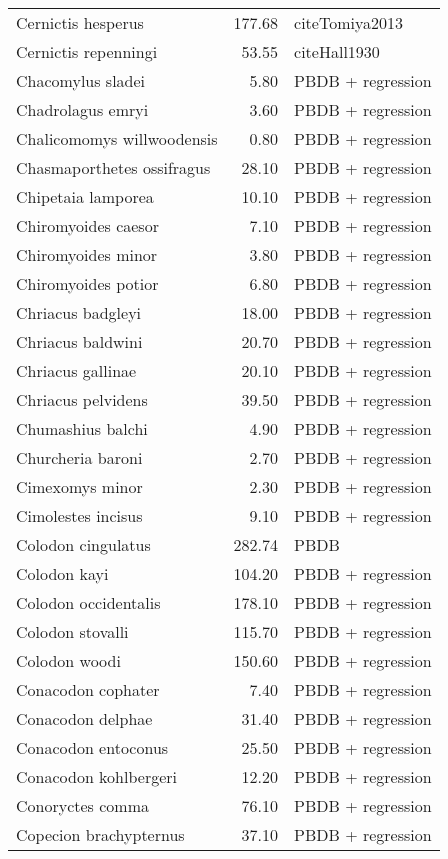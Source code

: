 \begin{table}[ht]
\begin{tabular}{lrl}
  Cernictis hesperus & 177.68 & cite{Tomiya2013} \\ 
  Cernictis repenningi & 53.55 & cite{Hall1930} \\ 
  Chacomylus sladei & 5.80 & PBDB + regression \\ 
  Chadrolagus emryi & 3.60 & PBDB + regression \\ 
  Chalicomomys willwoodensis & 0.80 & PBDB + regression \\ 
  Chasmaporthetes ossifragus & 28.10 & PBDB + regression \\ 
  Chipetaia lamporea & 10.10 & PBDB + regression \\ 
  Chiromyoides caesor & 7.10 & PBDB + regression \\ 
  Chiromyoides minor & 3.80 & PBDB + regression \\ 
  Chiromyoides potior & 6.80 & PBDB + regression \\ 
  Chriacus badgleyi & 18.00 & PBDB + regression \\ 
  Chriacus baldwini & 20.70 & PBDB + regression \\ 
  Chriacus gallinae & 20.10 & PBDB + regression \\ 
  Chriacus pelvidens & 39.50 & PBDB + regression \\ 
  Chumashius balchi & 4.90 & PBDB + regression \\ 
  Churcheria baroni & 2.70 & PBDB + regression \\ 
  Cimexomys minor & 2.30 & PBDB + regression \\ 
  Cimolestes incisus & 9.10 & PBDB + regression \\ 
  Colodon cingulatus & 282.74 & PBDB \\ 
  Colodon kayi & 104.20 & PBDB + regression \\ 
  Colodon occidentalis & 178.10 & PBDB + regression \\ 
  Colodon stovalli & 115.70 & PBDB + regression \\ 
  Colodon woodi & 150.60 & PBDB + regression \\ 
  Conacodon cophater & 7.40 & PBDB + regression \\ 
  Conacodon delphae & 31.40 & PBDB + regression \\ 
  Conacodon entoconus & 25.50 & PBDB + regression \\ 
  Conacodon kohlbergeri & 12.20 & PBDB + regression \\ 
  Conoryctes comma & 76.10 & PBDB + regression \\ 
  Copecion brachypternus & 37.10 & PBDB + regression \\ 

\end{tabular}
\end{table}
